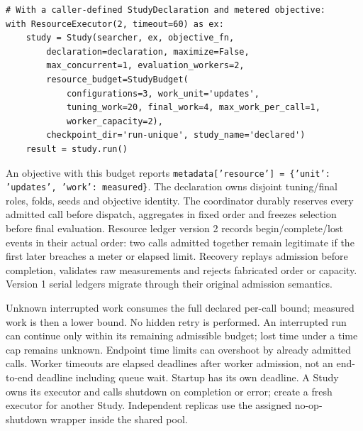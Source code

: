\begin{Verbatim}[fontsize=\small]
# With a caller-defined StudyDeclaration and metered objective:
with ResourceExecutor(2, timeout=60) as ex:
    study = Study(searcher, ex, objective_fn,
        declaration=declaration, maximize=False,
        max_concurrent=1, evaluation_workers=2,
        resource_budget=StudyBudget(
            configurations=3, work_unit='updates',
            tuning_work=20, final_work=4, max_work_per_call=1,
            worker_capacity=2),
        checkpoint_dir='run-unique', study_name='declared')
    result = study.run()
\end{Verbatim}

An objective with this budget reports
\texttt{metadata['resource'] = \{'unit': 'updates', 'work': measured\}}.
The declaration owns disjoint tuning/final roles, folds, seeds and objective
identity. The coordinator durably reserves every admitted call before dispatch,
aggregates in fixed order and freezes selection before final evaluation.
Resource ledger version 2 records begin/complete/lost events in their actual
order: two calls admitted together remain legitimate if the first later
breaches a meter or elapsed limit. Recovery replays admission before completion,
validates raw measurements and rejects fabricated order or capacity.
Version 1 serial ledgers migrate through their original admission semantics.

Unknown interrupted work consumes the full declared per-call bound; measured
work is then a lower bound. No hidden retry is performed. An interrupted run
can continue only within its remaining admissible budget; lost time under a
time cap remains unknown. Endpoint time limits can overshoot by already
admitted calls. Worker timeouts are elapsed deadlines after worker admission,
not an end-to-end deadline including queue wait. Startup has its own deadline. A Study owns its executor and calls shutdown on completion or error; create a fresh executor for another Study. Independent replicas use the assigned no-op-shutdown wrapper inside the shared pool.

